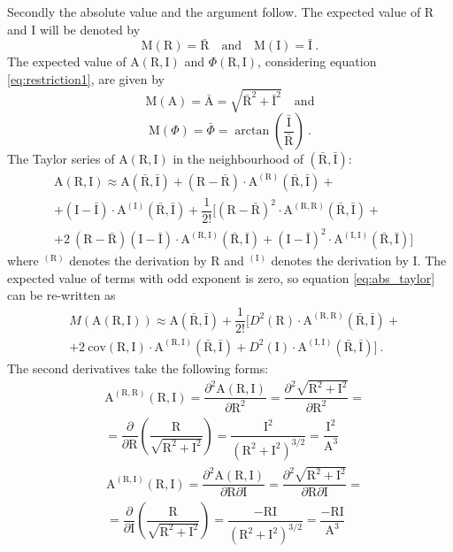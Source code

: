 \documentclass[a4paper,12pt,oneside]{article}
\newcommand{\Abs}{\mathrm{A}}
\newcommand{\Arg}{\Phi}
\newcommand{\R}{\mathrm{R}}
\newcommand{\I}{\mathrm{I}}
\begin{document}
Secondly the absolute value and the argument follow. The expected value of $\R$ and $\I$ will be denoted by
$$ \mathrm{M}(\R) = \bar{\R} \quad \mathrm{and} \quad \mathrm{M}(\I) = \bar{\I} \ .$$
The expected value of $\Abs(\R, \I)$ and $\Arg(\R, \I)$, considering equation \eqref{eq:restriction1}, are given by
$$ \mathrm{M}(\Abs) = \bar{\Abs} = \sqrt{\bar{\R}^2 + \bar{\I}^2} \quad \mathrm{and}$$
$$ \mathrm{M}(\Arg) = \bar{\Arg} = \arctan\left({\frac{\bar{\I}}{\bar{\R}}}\right) \ .$$
The Taylor series of $\Abs(\R, \I)$ in the neighbourhood of $(\bar{\R}, \bar{\I})$:
\begin{eqnarray}\label{eq:abs_taylor}
  & \Abs(\R, \I) \approx \Abs(\bar{\R}, \bar{\I}) + 
  (\R-\bar{\R}) \cdot \Abs^{(\R)}(\bar{\R}, \bar{\I}) + \nonumber\\
  & + (\I-\bar{\I}) \cdot \Abs^{(\I)}(\bar{\R}, \bar{\I}) +
  \dfrac{1}{2!} \Bigg[ (\R-\bar{\R})^2 \cdot \Abs^{(\R, \R)}(\bar{\R}, \bar{\I}) + \nonumber\\
  & + 2 \ (\R-\bar{\R})(\I-\bar{\I}) \cdot \Abs^{(\R, \I)}(\bar{\R}, \bar{\I}) + 
  (\I-\bar{\I})^2 \cdot \Abs^{(\I, \I)}(\bar{\R}, \bar{\I}) \Bigg] \ 
\end{eqnarray}
where $^{(\R)}$ denotes the derivation by $\R$ and $^{(\I)}$ denotes the derivation by $\I$. The expected value of terms with odd exponent is zero, so equation \eqref{eq:abs_taylor} can be re-written as
\begin{eqnarray}\label{eq:exp_abs}
  & M \left( \Abs(\R, \I) \right) \approx \Abs(\bar{\R}, \bar{\I}) + \dfrac{1}{2!} \Bigg[ D^2(\R) \cdot \Abs^{(\R, \R)}(\bar{\R}, \bar{\I}) + \nonumber\\
  & + 2 \ \mathrm{cov}(\R, \I) \cdot \Abs^{(\R, \I)}(\bar{\R}, \bar{\I}) + D^2(\I) \cdot \Abs^{(\I, \I)}(\bar{\R}, \bar{\I}) \Bigg] \ .
\end{eqnarray}
The second derivatives take the following forms:
\begin{eqnarray}\label{eq:rere}
  & \Abs^{(\R, \R)}(\R, \I) = \dfrac{\partial^2 \Abs(\R, \I)}{\partial \R^2} = 
  \dfrac{\partial^2 \sqrt{\R^2 + \I^2}}{\partial \R^2} =  \nonumber\\
  & = \dfrac{\partial}{\partial \R} \left( \dfrac{\R}{\sqrt{\R^2 + \I^2}} \right) =
  \dfrac{\I^2}{(\R^2 + \I^2)^{3/2}} = \dfrac{\I^2}{\Abs^3}
\end{eqnarray}
\begin{eqnarray}\label{eq:reim}
  & \Abs^{(\R, \I)}(\R, \I) = \dfrac{\partial^2 \Abs(\R, \I)}{\partial \R \partial \I} = 
  \dfrac{\partial^2 \sqrt{\R^2 + \I^2}}{\partial \R \partial \I} =  \nonumber\\
  & = \dfrac{\partial}{\partial \I} \left( \dfrac{\R}{\sqrt{\R^2 + \I^2}} \right) =
  \dfrac{- \R \I}{(\R^2 + \I^2)^{3/2}} = \dfrac{- \R \I}{\Abs^3}
\end{eqnarray}
\end{document}

